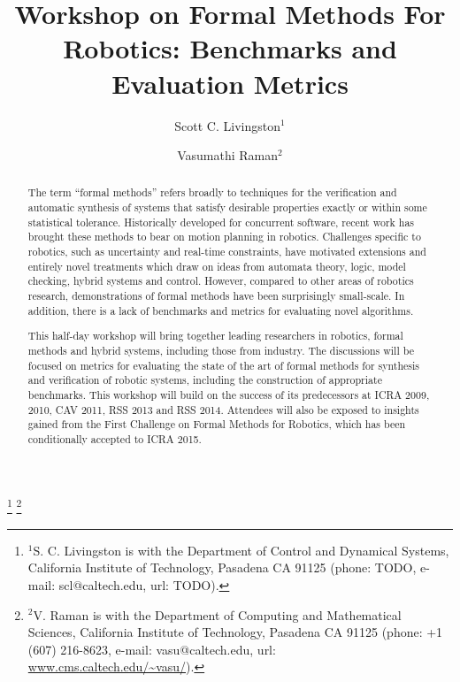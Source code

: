 \documentclass{amsart}
\theoremstyle{definition}
\begin{document}
\title{Workshop on Formal Methods For Robotics: Benchmarks and Evaluation Metrics}
\author{Scott C. Livingston$^{1}$}
\author{Vasumathi Raman$^{2}$}
\thanks{$^{1}$S. C. Livingston is with the Department of Control and Dynamical Systems, California Institute of Technology, Pasadena CA 91125 (phone: TODO, e-mail: scl@caltech.edu, url: TODO).}%
\thanks{$^{2}$V. Raman is with the Department of Computing and Mathematical Sciences, California Institute of Technology, Pasadena CA 91125 (phone: +1 (607) 216-8623, e-mail: vasu@caltech.edu, url: \url{www.cms.caltech.edu/~vasu/}).}%

\begin{abstract} %
The term ``formal methods'' refers broadly to techniques for the verification and automatic synthesis of systems that satisfy desirable properties exactly or within some statistical tolerance.  Historically developed for concurrent software, recent work has brought these methods to bear on motion planning in robotics. Challenges specific to robotics, such as uncertainty and
real-time constraints, have motivated extensions and entirely novel treatments which draw on ideas from automata theory, logic, model checking, hybrid systems and control.  However, compared to other areas of robotics research, demonstrations of formal methods have been surprisingly small-scale. In addition, there is a lack of benchmarks and metrics for evaluating novel algorithms.

This half-day workshop will bring together leading researchers in robotics, formal methods and hybrid systems, including those from industry. The discussions will be focused on metrics for evaluating the state of the art of formal methods for synthesis and verification of robotic systems, including the construction of appropriate benchmarks. This workshop will build on the success of its predecessors at ICRA 2009, 2010, CAV 2011, RSS 2013 and RSS 2014. Attendees will also be exposed to insights gained from the First Challenge on Formal Methods for Robotics, which has been conditionally accepted to ICRA 2015.

\end{abstract}
\maketitle
\end{document}

